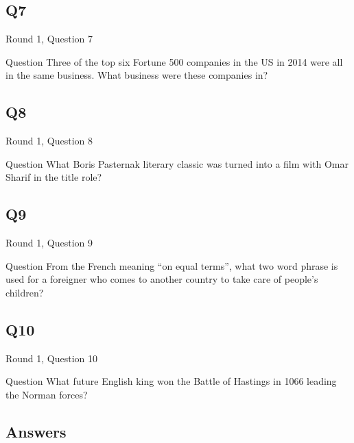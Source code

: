\documentclass[11pt]{beamer}
\begin{document}
\subsection*{Q7}
\begin{frame}[t]{Round 1, Question 7}
\vspace{2em}
\begin{block}{Question}
Three of the top six Fortune 500 companies in the US in 2014 were all in the same business. What business were these companies in\@?
\end{block}
\end{frame}
    

\subsection*{Q8}
\begin{frame}[t]{Round 1, Question 8}
\vspace{2em}
\begin{block}{Question}
What Boris Pasternak literary classic was turned into a film with Omar Sharif in the title role\@?
\end{block}
\end{frame}
    

\subsection*{Q9}
\begin{frame}[t]{Round 1, Question 9}
\vspace{2em}
\begin{block}{Question}
From the French meaning ``on equal terms'', what two word phrase is used for a foreigner who comes to another country to take care of people's children\@?
\end{block}
\end{frame}
    

\subsection*{Q10}
\begin{frame}[t]{Round 1, Question 10}
\vspace{2em}
\begin{block}{Question}
What future English king won the Battle of Hastings in 1066 leading the Norman forces\@?
\end{block}
\end{frame}
    
\subsection{Answers}
\end{document}
